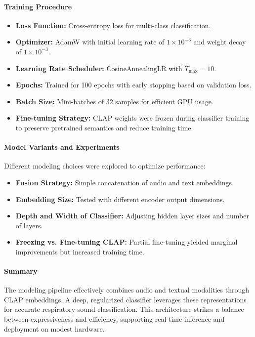\paragraph{Training Procedure}
\begin{itemize}
    \item \textbf{Loss Function:} Cross-entropy loss for multi-class classification.
    \item \textbf{Optimizer:} AdamW with initial learning rate of $1 \times 10^{-3}$ and weight decay of $1 \times 10^{-3}$.
    \item \textbf{Learning Rate Scheduler:} CosineAnnealingLR with $T_{\text{max}} = 10$.
    \item \textbf{Epochs:} Trained for 100 epochs with early stopping based on validation loss.
    \item \textbf{Batch Size:} Mini-batches of 32 samples for efficient GPU usage.
    \item \textbf{Fine-tuning Strategy:} CLAP weights were frozen during classifier training to preserve pretrained semantics and reduce training time.
\end{itemize}

\paragraph{Model Variants and Experiments}
Different modeling choices were explored to optimize performance:
\begin{itemize}
    \item \textbf{Fusion Strategy:} Simple concatenation of audio and text embeddings.
    \item \textbf{Embedding Size:} Tested with different encoder output dimensions.
    \item \textbf{Depth and Width of Classifier:} Adjusting hidden layer sizes and number of layers.
    \item \textbf{Freezing vs. Fine-tuning CLAP:} Partial fine-tuning yielded marginal improvements but increased training time.
\end{itemize}

\paragraph{Summary}
The modeling pipeline effectively combines audio and textual modalities through CLAP embeddings. A deep, regularized classifier leverages these representations for accurate respiratory sound classification. This architecture strikes a balance between expressiveness and efficiency, supporting real-time inference and deployment on modest hardware.
